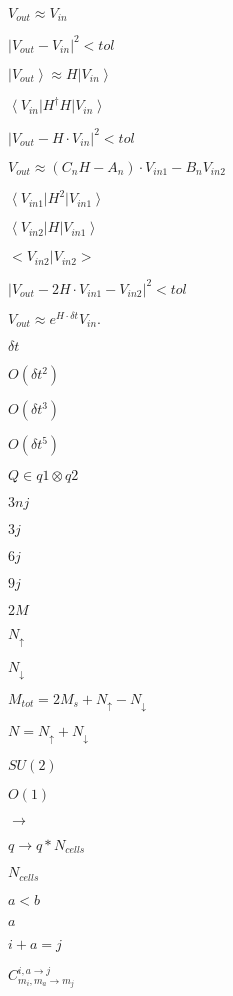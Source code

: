 \documentclass{article}
\begin{document}
$V_{out} \approx V_{in}$
\pagebreak

$\left|V_{out}-V_{in}\right|^2<tol$
\pagebreak

$\left|V_{out}\right> \approx H \left|V_{in}\right>$
\pagebreak

$\left<V_{in}\right|H^{\dagger}H\left|V_{in}\right>$
\pagebreak

$\left|V_{out} - H \cdot V_{in}\right|^2<tol$
\pagebreak

$V_{out} \approx (C_n H - A_n) \cdot V_{in1} - B_n V_{in2}$
\pagebreak

$\left<V_{in1}\right|H^2\left|V_{in1}\right>$
\pagebreak

$\left<V_{in2}\right|H\left|V_{in1}\right>$
\pagebreak

$\big<V_{in2}\big|V_{in2}\big>$
\pagebreak

$\left|V_{out} - 2H \cdot V_{in1} - V_{in2}\right|^2<tol$
\pagebreak

$V_{out} \approx e^{H \cdot \delta t} V_{in}.$
\pagebreak

$\delta t$
\pagebreak

$O(\delta t^2)$
\pagebreak

$O(\delta t^3)$
\pagebreak

$O(\delta t^5)$
\pagebreak

$Q \in q1 \otimes q2$
\pagebreak

$3nj$
\pagebreak

$3j$
\pagebreak

$6j$
\pagebreak

$9j$
\pagebreak

$2M$
\pagebreak

$N_{\uparrow}$
\pagebreak

$N_{\downarrow}$
\pagebreak

$M_{tot}=2M_{s}+N_{\uparrow}-N_{\downarrow}$
\pagebreak

$N=N_{\uparrow}+N_{\downarrow}$
\pagebreak

$SU(2)$
\pagebreak

$O(1)$
\pagebreak

$\to$
\pagebreak

$q \rightarrow q * N_{cells}$
\pagebreak

$N_{cells}$
\pagebreak

$a<b$
\pagebreak

$a$
\pagebreak

$i+a=j$
\pagebreak

$C^{i,a\rightarrow j}_{m_i,m_a\rightarrow m_j}$
\pagebreak
\end{document}
